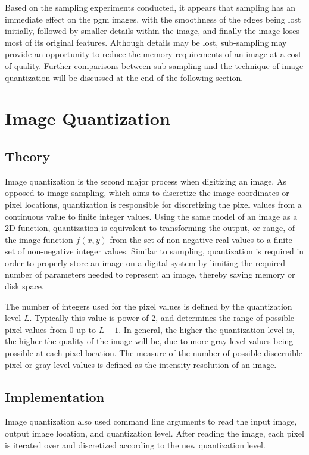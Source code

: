 \documentclass[headings=optiontoheadandtoc,listof=totoc,parskip=full]{scrartcl}
\begin{document}
Based on the sampling experiments conducted, it appears that sampling has an immediate effect on the pgm images, with the smoothness of the edges being lost initially, followed by smaller details within the image, and finally the image loses most of its original features. Although details may be lost, sub-sampling may provide an opportunity to reduce the memory requirements of an image at a cost of quality. Further comparisons between sub-sampling and the technique of image quantization will be discussed at the end of the following section.

\section{Image Quantization}

\subsection{Theory}
Image quantization is the second major process when digitizing an image. As opposed to image sampling, which aims to discretize the image coordinates or pixel locations, quantization is responsible for discretizing the pixel values from a continuous value to finite integer values. Using the same model of an image as a 2D function, quantization is equivalent to transforming the output, or range, of the image function $f(x,y)$ from the set of non-negative real values to a finite set of non-negative integer values. Similar to sampling, quantization is required in order to properly store an image on a digital system by limiting the required number of parameters needed to represent an image, thereby saving memory or disk space.

The number of integers used for the pixel values is defined by the quantization level $L$. Typically this value is power of 2, and determines the range of possible pixel values from 0 up to $L-1$. In general, the higher the quantization level is, the higher the quality of the image will be, due to more gray level values being possible at each pixel location. The measure of the number of possible discernible pixel or gray level values is defined as the intensity resolution of an image.

\subsection{Implementation}

Image quantization also used command line arguments to read the input image, output image location, and quantization level. After reading the image, each pixel is iterated over and discretized according to the new quantization level. 
\end{document}
